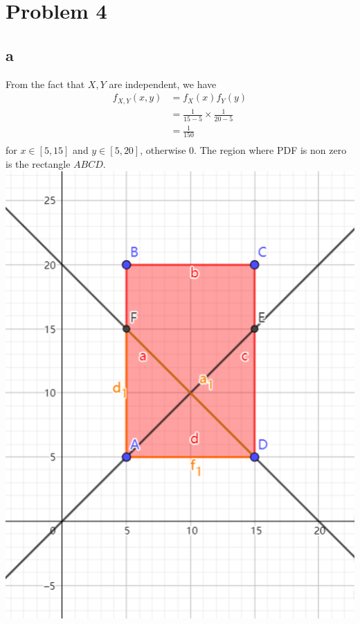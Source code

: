 \documentclass[12pt,letterpaper]{article}
\begin{document}
\section*{Problem 4}
    \subsection*{a}
        From the fact that $X, Y$ are independent, we have
        \begin{equation*}
            \begin{aligned}
                f_{X, Y}(x, y) &= f_{X}(x) f_{Y}(y) \\
                &= \frac{1}{15 - 5} \times \frac{1}{20 - 5} \\
                &= \frac{1}{150} \\
            \end{aligned}
        \end{equation*}
        for $x \in [5, 15]$ and $y \in [5, 20]$, otherwise 0.
        The region where PDF is non zero is the rectangle $ABCD$.
        {\center\includegraphics[scale=0.7]{rect.png}}
\end{document}
